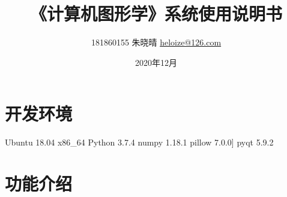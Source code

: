 \documentclass[a4paper,UTF8]{article}
\begin{document}
\title{《计算机图形学》系统使用说明书}
\author{181860155 朱晓晴 \href{mailto:heloize@126.com}{heloize@126.com}}
\date{2020年12月}
\maketitle

\section{开发环境}
Ubuntu 18.04 x86_64
Python 3.7.4
numpy 1.18.1
pillow 7.0.0]
pyqt 5.9.2


\section{功能介绍}
\end{document}
